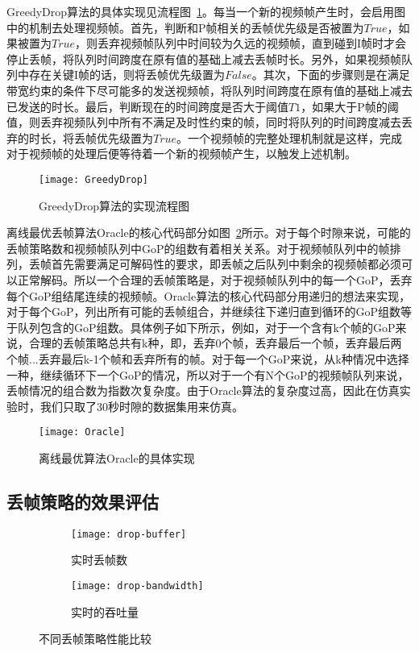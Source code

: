 GreedyDrop算法的具体实现见流程图~\ref{fig:GreedyDrop}。每当一个新的视频帧产生时，会启用图中的机制去处理视频帧。首先，判断和P帧相关的丢帧优先级是否被置为$True$，如果被置为$True$，则丢弃视频帧队列中时间较为久远的视频帧，直到碰到I帧时才会停止丢帧，将队列时间跨度在原有值的基础上减去丢帧时长。另外，如果视频帧队列中存在关键I帧的话，则将丢帧优先级置为$False$。其次，下面的步骤则是在满足带宽约束的条件下尽可能多的发送视频帧，将队列时间跨度在原有值的基础上减去已发送的时长。最后，判断现在的时间跨度是否大于阈值$T1$，如果大于P帧的阈值，则丢弃视频队列中所有不满足及时性约束的帧，同时将队列的时间跨度减去丢弃的时长，将丢帧优先级置为$True$。一个视频帧的完整处理机制就是这样，完成对于视频帧的处理后便等待着一个新的视频帧产生，以触发上述机制。
\begin{figure}[htb]
    \centering
    \texttt{[image: GreedyDrop]}
    \caption{GreedyDrop算法的实现流程图}
    \label{fig:GreedyDrop}
\end{figure}

离线最优丢帧算法Oracle的核心代码部分如图~\ref{fig:Oralce}所示。对于每个时隙来说，可能的丢帧策略数和视频帧队列中GoP的组数有着相关关系。对于视频帧队列中的帧排列，丢帧首先需要满足可解码性的要求，即丢帧之后队列中剩余的视频帧都必须可以正常解码。所以一个合理的丢帧策略是，对于视频帧队列中的每一个GoP，丢弃每个GoP组结尾连续的视频帧。Oracle算法的核心代码部分用递归的想法来实现，对于每个GoP，列出所有可能的丢帧组合，并继续往下递归直到循环的GoP组数等于队列包含的GoP组数。具体例子如下所示，例如，对于一个含有k个帧的GoP来说，合理的丢帧策略总共有k种，即，丢弃0个帧，丢弃最后一个帧，丢弃最后两个帧...丢弃最后k-1个帧和丢弃所有的帧。对于每一个GoP来说，从k种情况中选择一种，继续循环下一个GoP的情况，所以对于一个有N个GoP的视频帧队列来说，丢帧情况的组合数为指数次复杂度。由于Oracle算法的复杂度过高，因此在仿真实验时，我们只取了30秒时隙的数据集用来仿真。
\begin{figure}[htb]
    \centering
    \texttt{[image: Oracle]}
    \caption{离线最优算法Oracle的具体实现}
    \label{fig:Oralce}
\end{figure}

\subsection{丢帧策略的效果评估}
\begin{figure}[tb]
  \centering%
  \begin{subfigure}{0.49\textwidth}
    \texttt{[image: drop-buffer]}
    \caption{实时丢帧数}
    \label{fig:drop-buffer}
  \end{subfigure}%
  \hfill
  \begin{subfigure}{0.49\textwidth}
    \texttt{[image: drop-bandwidth]}
    \caption{实时的吞吐量}
    \label{fig:drop-bandwidth}
  \end{subfigure}
  \vspace{0.1in}
  \caption{不同丢帧策略性能比较}
  \label{fig:drop_comparison}
\end{figure}

